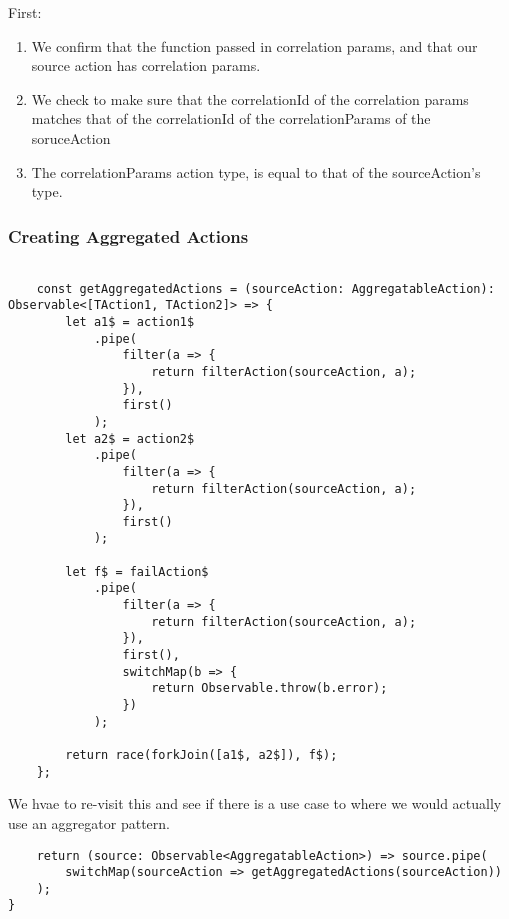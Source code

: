 First:
\begin{enumerate}
  \item We confirm that the function passed in correlation params, and that our
source action has correlation params.
  \item We check to make sure that the correlationId of the correlation params
  matches that of the correlationId of the correlationParams of the soruceAction
  \item The correlationParams action type, is equal to that of the
  sourceAction's type.
\end{enumerate}

\subsubsection{ Creating Aggregated Actions }
\begin{lstlisting}

    const getAggregatedActions = (sourceAction: AggregatableAction): Observable<[TAction1, TAction2]> => {
        let a1$ = action1$
            .pipe(
                filter(a => {
                    return filterAction(sourceAction, a);
                }),
                first()
            );
        let a2$ = action2$
            .pipe(
                filter(a => {
                    return filterAction(sourceAction, a);
                }),
                first()
            );

        let f$ = failAction$
            .pipe(
                filter(a => {
                    return filterAction(sourceAction, a);
                }),
                first(),
                switchMap(b => {
                    return Observable.throw(b.error);
                })
            );

        return race(forkJoin([a1$, a2$]), f$);
    };
\end{lstlisting}

We hvae to re-visit this and see if there is a use case to where we would
actually use an aggregator pattern.
\begin{lstlisting}
    return (source: Observable<AggregatableAction>) => source.pipe(
        switchMap(sourceAction => getAggregatedActions(sourceAction))
    );
}
\end{lstlisting}
